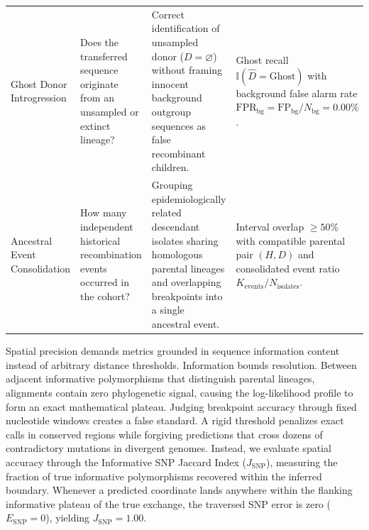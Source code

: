 \begin{table}[t!]
\begin{tabularx}{\textwidth}{>{\raggedright\arraybackslash}p{2.5cm} >{\raggedright\arraybackslash}p{3.2cm} Y Y}
\addlinespace
Ghost Donor Introgression & Does the transferred sequence originate from an unsampled or extinct lineage? & Correct identification of unsampled donor ($D = \varnothing$) without framing innocent background outgroup sequences as false recombinant children. & Ghost recall $\mathbb{I}(\hat{D} = \text{Ghost})$ with background false alarm rate $\text{FPR}_{\text{bg}} = \text{FP}_{\text{bg}} / N_{\text{bg}} = 0.00\%$. \\
\addlinespace
Ancestral Event Consolidation & How many independent historical recombination events occurred in the cohort? & Grouping epidemiologically related descendant isolates sharing homologous parental lineages and overlapping breakpoints into a single ancestral event. & Interval overlap $\ge 50\%$ with compatible parental pair $(H, D)$ and consolidated event ratio $K_{\text{events}} / N_{\text{isolates}}$. \\
\bottomrule
\end{tabularx}
\end{table}

Spatial precision demands metrics grounded in sequence information content instead of arbitrary distance thresholds.
Information bounds resolution.
Between adjacent informative polymorphisms that distinguish parental lineages, alignments contain zero phylogenetic signal, causing the log-likelihood profile to form an exact mathematical plateau.
Judging breakpoint accuracy through fixed nucleotide windows creates a false standard.
A rigid threshold penalizes exact calls in conserved regions while forgiving predictions that cross dozens of contradictory mutations in divergent genomes.
Instead, we evaluate spatial accuracy through the Informative SNP Jaccard Index ($J_{\text{SNP}}$), measuring the fraction of true informative polymorphisms recovered within the inferred boundary.
Whenever a predicted coordinate lands anywhere within the flanking informative plateau of the true exchange, the traversed SNP error is zero ($E_{\text{SNP}} = 0$), yielding $J_{\text{SNP}} = 1.00$.

